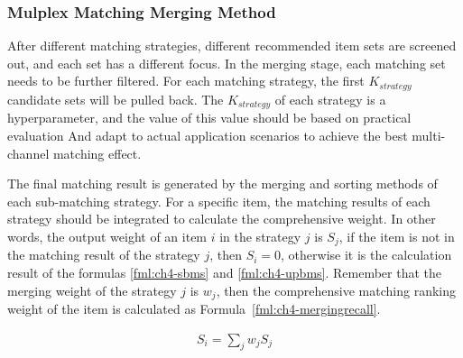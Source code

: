 \subsubsection{Mulplex Matching Merging Method}


After different matching strategies, different recommended item sets are screened out, and each set has a different focus. In the merging stage, each matching set needs to be further filtered. For each matching strategy, the first \(K_{strategy}\) candidate sets will be pulled back. The \(K_{strategy}\) of each strategy is a hyperparameter, and the value of this value should be based on practical evaluation And adapt to actual application scenarios to achieve the best multi-channel matching effect.

The final matching result is generated by the merging and sorting methods of each sub-matching strategy. For a specific item, the matching results of each strategy should be integrated to calculate the comprehensive weight. In other words, the output weight of an item \(i\) in the strategy \(j\) is \(S_j\), if the item is not in the matching result of the strategy \(j\), then \(S_i =0\), otherwise it is the calculation result of the formulas \ref{fml:ch4-sbms} and \ref{fml:ch4-upbms}. Remember that the merging weight of the strategy \(j\) is \(w_j\), then the comprehensive matching ranking weight of the item is calculated as Formula~\ref{fml:ch4-mergingrecall}.

\begin{align}
  S_i = \sum_{j}{w_j S_j}\label{fml:ch4-mergingrecall}
\end{align}




